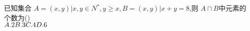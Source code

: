 \documentclass[class=ctexart,crop=false]{standalone}
\begin{document}
    已知集合 $A={(x,y)|x,y\in N^*,y \geqslant x},B={(x,y)|x+y=8}$,则 $A\cap B$中元素的个数为\hfill (\qquad)\\
    $A. 2\hfill B. 3\hfill C. 4\hfill D. 6\hfill$
\end{document}
